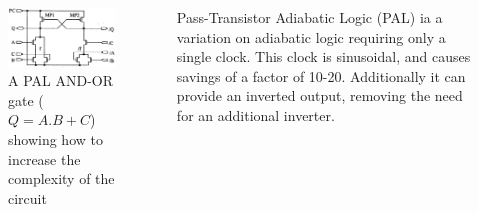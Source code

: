 \begin{columns}
	\begin{column}{0.49\textwidth}
\begin{figure}
	\centering
	\includegraphics[width=\columnwidth]{../../images/palandor.png}
	\caption{A PAL AND-OR gate ($Q=A.B+C$) showing how to increase the complexity of the circuit \cite{PAL}}
	\label{fig:palandor}
\end{figure}
	\end{column}
	\begin{column}{0.49\textwidth}
		Pass-Transistor Adiabatic Logic (PAL) ia a variation on adiabatic logic requiring only a single clock.
		This clock is sinusoidal, and causes savings of a factor of 10-20.
		Additionally it can provide an inverted output, removing the need for an additional inverter.
	\end{column}
\end{columns}

